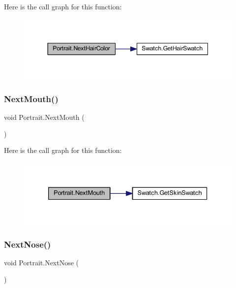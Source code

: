 Here is the call graph for this function\+:\nopagebreak
\begin{figure}[H]
\begin{center}
\leavevmode
\includegraphics[width=344pt]{class_portrait_a8117eeefced674e0a4a483745ea0053d_cgraph}
\end{center}
\end{figure}
\mbox{\label{class_portrait_ae5ff256c7c14879853d221dfd9df2d63}} 
\subsubsection{\texorpdfstring{NextMouth()}{NextMouth()}}
{\footnotesize\ttfamily void Portrait.\+Next\+Mouth (\begin{DoxyParamCaption}{ }\end{DoxyParamCaption})}

Here is the call graph for this function\+:\nopagebreak
\begin{figure}[H]
\begin{center}
\leavevmode
\includegraphics[width=333pt]{class_portrait_ae5ff256c7c14879853d221dfd9df2d63_cgraph}
\end{center}
\end{figure}
\mbox{\label{class_portrait_a7fc2c7d9f078303182503c717c05b9d5}} 
\subsubsection{\texorpdfstring{NextNose()}{NextNose()}}
{\footnotesize\ttfamily void Portrait.\+Next\+Nose (\begin{DoxyParamCaption}{ }\end{DoxyParamCaption})}

